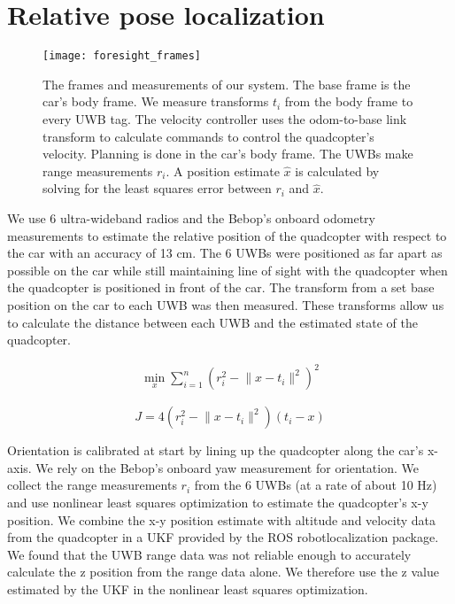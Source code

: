 
\section{Relative pose localization}

\begin{figure}
  \centering
    \texttt{[image: foresight\_frames]}
  \caption{The frames and measurements of our system. The base frame
   is the car's body frame. We measure transforms $t_{i}$ from the body
   frame to every UWB tag. The velocity controller uses the odom-to-base\textunderscore 
   link transform to calculate commands to control the quadcopter's velocity.
   Planning is done in the car's body frame.
   The UWBs make range measurements $r_{i}$. A position estimate $\hat{x}$
   is calculated by solving for the least squares error between $r_{i}$ and $\hat{x}$.}
  \label{fig:frames}
\end{figure}

We use 6 ultra-wideband radios and the Bebop's onboard odometry measurements
to estimate the relative position of the quadcopter with respect to the car with an
accuracy of 13 cm. The 6 UWBs were positioned as far apart as possible on the
car while still maintaining line of sight with the quadcopter when the
quadcopter is positioned in front of the car. The transform from a set base position
on the car to each UWB was then measured. These transforms allow us to
calculate the distance between each UWB and the estimated state of the quadcopter.

\begin{align*} 
    \min_{x} \sum_{i=1}^{n} (r_{i}^2 - \lVert x - t_i\rVert^2)^2
\end{align*}

$$
    J = 4(r_i^2 - \lVert x - t_i \rVert^2)(t_i - x)
$$

Orientation is calibrated at start by lining up the quadcopter along the car's x-axis.
We rely on the Bebop's onboard yaw measurement for orientation.
We collect the range measurements $r_{i}$ from the 6 UWBs (at a rate of about 10 Hz)
and use nonlinear least squares optimization to estimate the quadcopter's x-y position. 
We combine the x-y position estimate with altitude and velocity data from the quadcopter in
a UKF provided by the ROS robot\textunderscore localization package.  We found that
the UWB range data was not reliable enough to accurately calculate the z position
from the range data alone. We therefore use the z value estimated by the UKF in
the nonlinear least squares optimization.